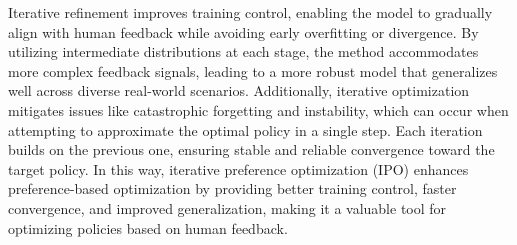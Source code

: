 Iterative refinement improves training control, enabling the model to gradually align with human feedback while avoiding early overfitting or divergence. By utilizing intermediate distributions at each stage, the method accommodates more complex feedback signals, leading to a more robust model that generalizes well across diverse real-world scenarios.
Additionally, iterative optimization mitigates issues like catastrophic forgetting and instability, which can occur when attempting to approximate the optimal policy in a single step. Each iteration builds on the previous one, ensuring stable and reliable convergence toward the target policy.
In this way, iterative preference optimization (IPO) enhances preference-based optimization by providing better training control, faster convergence, and improved generalization, making it a valuable tool for optimizing policies based on human feedback.





